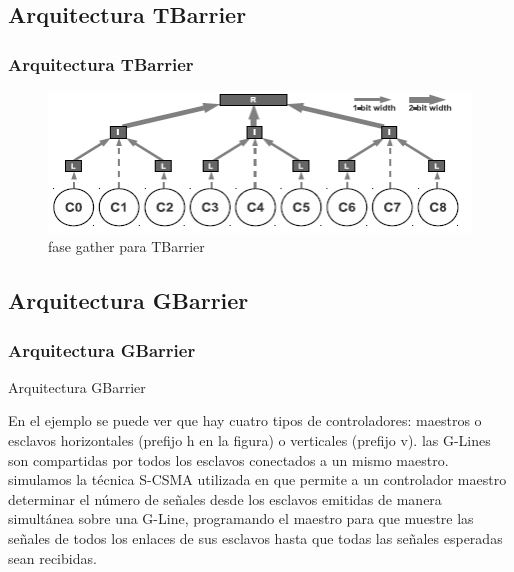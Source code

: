 \documentclass[11pt]{beamer}					%
\begin{document}
			\subsection{Arquitectura TBarrier}			
			\begin{frame}[fragile]
		\frametitle{Arquitectura TBarrier}
			
	\begin{figure}[ht] %
	\centering
		\includegraphics[scale=1]{imagenes/TBarrier.png}   %
	\caption{fase gather para TBarrier} \label{fig:fase gather para TBarrier}
\end{figure}
				
	
			\end{frame}
			
			
			
\subsection{Arquitectura GBarrier}			
			\begin{frame}[fragile]
		\frametitle{Arquitectura GBarrier}
			
			\begin{block}{Arquitectura GBarrier}
			
			
En el ejemplo se puede ver que hay cuatro tipos de
controladores: maestros o esclavos horizontales (prefijo
h en la figura) o verticales (prefijo v). las G-Lines
son compartidas por todos los esclavos conectados
a un mismo maestro.\\
simulamos la técnica S-CSMA utilizada en que permite a un controlador
maestro determinar el número de señales desde
los esclavos emitidas de manera simultánea sobre una
G-Line, programando el maestro para que muestre
las señales de todos los enlaces de sus esclavos hasta
que todas las señales esperadas sean recibidas.

				\end{block}
				
	
			\end{frame}
			
\end{document}

